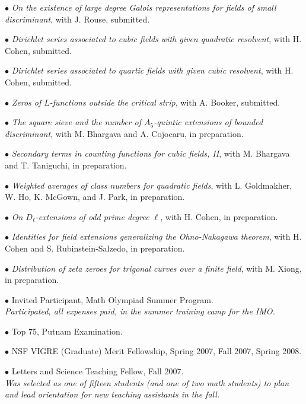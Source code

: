 \documentclass{article}
\newcommand{\categorywidth}{1in}        %
\newcommand{\categorysep}{5pt}
\newcommand{\catlistlabel}[1]%
{\raisebox{0pt}[1ex][0pt]{\makebox[\labelwidth][l]%
    {\parbox[t]{\labelwidth}{\hspace{0pt}\textbf{#1}}}}}
\newenvironment{categories}{\begin{list}{}{
      \setlength{\labelwidth}{\categorywidth}
      \setlength{\leftmargin}{\labelwidth}
      \addtolength{\leftmargin}{\labelsep}
      \setlength{\topsep}{20pt}
      \setlength{\itemsep}{\categorysep}
      \renewcommand{\makelabel}{\catlistlabel}
      }}{\end{list}}
\newcommand{\category}[1]{\item[#1]}
\begin{document}
\begin{flushleft}
\begin{categories}
{  $\bullet$ {\itshape On the existence of large degree Galois representations for fields of small
discriminant}, with J. Rouse, submitted.

  $\bullet$ {\itshape Dirichlet series associated to cubic fields with given quadratic resolvent}, with H. Cohen,
submitted.

  $\bullet$ {\itshape Dirichlet series associated to quartic fields with given cubic resolvent}, with H. Cohen, submitted.

  $\bullet$ {\itshape Zeros of $L$-functions outside the critical strip}, with A. Booker, submitted.

  $\bullet$ {\itshape The square sieve and the number of $A_5$-quintic extensions of bounded discriminant}, 
with M. Bhargava and A. Cojocaru, in preparation.

  $\bullet$ {\itshape Secondary terms in counting functions for cubic fields, II}, 
with M. Bhargava and T. Taniguchi, in preparation.

  $\bullet$ {\itshape Weighted averages of class numbers for quadratic fields},
with L. Goldmakher, W. Ho, K. McGown, and J. Park, in preparation.

  $\bullet$ {\itshape On $D_{\ell}$-extensions of odd prime degree $\ell$}, 
with H. Cohen, in preparation.

  $\bullet$ {\itshape Identities for field extensions generalizing the Ohno-Nakagawa theorem}, 
with H. Cohen and S. Rubinstein-Salzedo, in preparation.

  $\bullet$ {\itshape Distribution of zeta zeroes for trigonal curves over a finite field}, 
with M. Xiong, in preparation.


  \category{Awards, Grants, \\ and Prizes}

  $\bullet$ {Invited Participant, Math Olympiad Summer Program. \\
  \itshape Participated, all expenses paid, in the summer training camp for the IMO. \upshape }

  $\bullet$ {Top 75, Putnam Examination.}

  $\bullet$ {NSF VIGRE (Graduate) Merit Fellowship, Spring 2007, Fall 2007, Spring 2008.}

  $\bullet$ {Letters and Science Teaching Fellow, Fall 2007. \\
\itshape Was selected as one of fifteen students (and one of two math students)
to plan and lead orientation for new teaching assistants in the fall.
\upshape }

}
\end{categories}
\end{flushleft}
\end{document}
